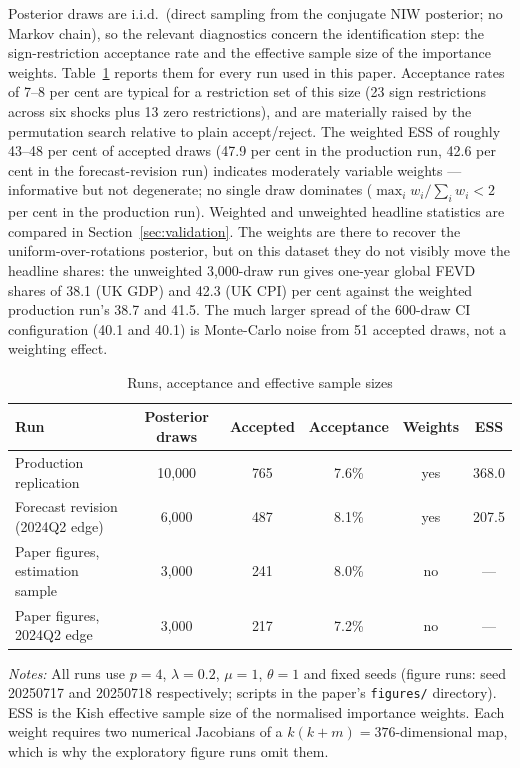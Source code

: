 Posterior draws are i.i.d.\ (direct sampling from the conjugate NIW posterior; no Markov chain), so the relevant diagnostics concern the identification step: the sign-restriction acceptance rate and the effective sample size of the \citet{arias2018} importance weights. Table~\ref{tab:diagnostics} reports them for every run used in this paper. Acceptance rates of 7--8 per cent are typical for a restriction set of this size (23 sign restrictions across six shocks plus 13 zero restrictions), and are materially raised by the \citet{chan2025} permutation search relative to plain accept/reject. The weighted ESS of roughly 43--48 per cent of accepted draws (47.9 per cent in the production run, 42.6 per cent in the forecast-revision run) indicates moderately variable weights --- informative but not degenerate; no single draw dominates ($\max_i w_i / \sum_i w_i < 2$ per cent in the production run). Weighted and unweighted headline statistics are compared in Section~\ref{sec:validation}. The weights are there to recover the uniform-over-rotations posterior, but on this dataset they do not visibly move the headline shares: the unweighted 3{,}000-draw run gives one-year global FEVD shares of 38.1 (UK GDP) and 42.3 (UK CPI) per cent against the weighted production run's 38.7 and 41.5. The much larger spread of the 600-draw CI configuration (40.1 and 40.1) is Monte-Carlo noise from 51 accepted draws, not a weighting effect.

\begin{table}[h]
\centering
\caption{Runs, acceptance and effective sample sizes}
\label{tab:diagnostics}
\small
\begin{tabular}{lccccc}
\toprule
Run & Posterior draws & Accepted & Acceptance & Weights & ESS \\
\midrule
Production replication & 10{,}000 & 765 & 7.6\% & yes & 368.0 \\
Forecast revision (2024Q2 edge) & 6{,}000 & 487 & 8.1\% & yes & 207.5 \\
Paper figures, estimation sample & 3{,}000 & 241 & 8.0\% & no & --- \\
Paper figures, 2024Q2 edge & 3{,}000 & 217 & 7.2\% & no & --- \\
\bottomrule
\end{tabular}
\par\smallskip
\parbox{0.9\textwidth}{\footnotesize \emph{Notes:} All runs use $p=4$, $\lambda=0.2$, $\mu=1$, $\theta=1$ and fixed seeds (figure runs: seed 20250717 and 20250718 respectively; scripts in the paper's \texttt{figures/} directory). ESS is the Kish effective sample size of the normalised importance weights. Each weight requires two numerical Jacobians of a $k(k+m) = 376$-dimensional map, which is why the exploratory figure runs omit them.}
\end{table}
